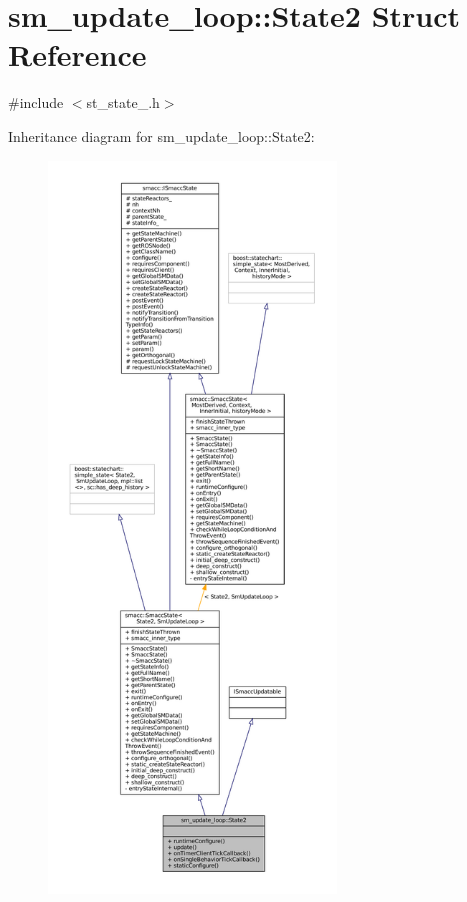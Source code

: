\hypertarget{structsm__update__loop_1_1State2}{}\section{sm\+\_\+update\+\_\+loop\+:\+:State2 Struct Reference}
\label{structsm__update__loop_1_1State2}


{\ttfamily \#include $<$st\+\_\+state\+\_.\+h$>$}



Inheritance diagram for sm\+\_\+update\+\_\+loop\+:\+:State2\+:
\nopagebreak
\begin{figure}[H]
\begin{center}
\leavevmode
\includegraphics[height=550pt]{structsm__update__loop_1_1State2__inherit__graph}
\end{center}
\end{figure}


